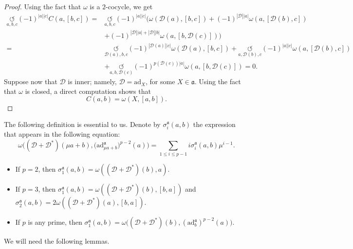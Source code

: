 \documentclass[pdftex]{sigma}
\numberwithin{equation}{section}
\begin{document}
\begin{proof}
Using the fact that $\omega$ is a $2$-cocycle, we get
\begin{align*}
 \underset{a,b,c}{\circlearrowleft}(-1)^{|a||c|}C(a,[b,c])={}& \underset{a,b,c}{\circlearrowleft}(-1)^{|a||c|}\bigl(\omega({\mathscr D}(a),[b,c])+(-1)^{|{\mathscr D}||a|}\omega(a,[{\mathscr D}(b),c])\\
 &+(-1)^{|{\mathscr D}||a|+|{\mathscr D}||b|}\omega(a,[b,{\mathscr D}(c)])\bigr)\\
={}& \underset{{\mathscr D}(a),b,c}{\circlearrowleft}(-1)^{|{\mathscr D}(a)||c|}\omega({\mathscr D}(a),[b,c])+\underset{a,{\mathscr D}(b),c}{\circlearrowleft}\!(-1)^{|a||c|}\omega(a,[{\mathscr D}(b),c])\\
 &+\underset{a,b,{\mathscr D}(c)}{\circlearrowleft}(-1)^{p({\mathscr D}(c))|a|}\omega(a,[b,{\mathscr D}(c)])=0.
\end{align*}
Suppose now that $\mathscr D$ is inner; namely, $\mathscr D=\mathrm{ad}_X$, for some $X\in \mathfrak{a}$. Using the fact that $\omega$ is closed, a direct computation shows that
\[
C(a,b)=\omega(X, [a,b]). \tag*{\qed}
\]
 \renewcommand{\qed}{}
\end{proof}
The following definition is essential to us. Denote by $\sigma_i^\mathfrak{a}(a,b)$ the expression that appears in the following equation:
\begin{equation}\label{defsigma}
\omega\bigl(({\mathscr D}+{\mathscr D}^*)(\mu a+b),\bigl(\mathrm{ad}^\mathfrak{a}_{\mu a+b}\bigr)^{p-2}(a) \bigr)= \sum_{1\leq i \leq p-1}i \sigma_i^\mathfrak{a}(a,b)\mu^{i-1}.
\end{equation}
\begin{itemize}\itemsep=0pt
\item If $p=2$, then $\sigma_1^\mathfrak{a}(a,b)=\omega(({\mathscr D}+{\mathscr D}^*)(b),a).$
\item If $p=3$, then $\sigma_1^{\mathfrak{a}}(a,b)=\omega(({\mathscr D}+{\mathscr D}^*)(b),[b,a])$ and $\sigma_2^{\mathfrak{a}}(a,b)=2\omega(({\mathscr D}+{\mathscr D}^*)(a),[b,a])$.
\item If $p$ is any prime, then $\sigma_1^{\mathfrak{a}}(a,b)=\omega\bigl(({\mathscr D}+{\mathscr D}^*)(b),(\mathrm{ad}^{\mathfrak{a}}_b)^{p-2}(a)\bigr)$.
\end{itemize}
We will need the following lemmas.
\end{document}
